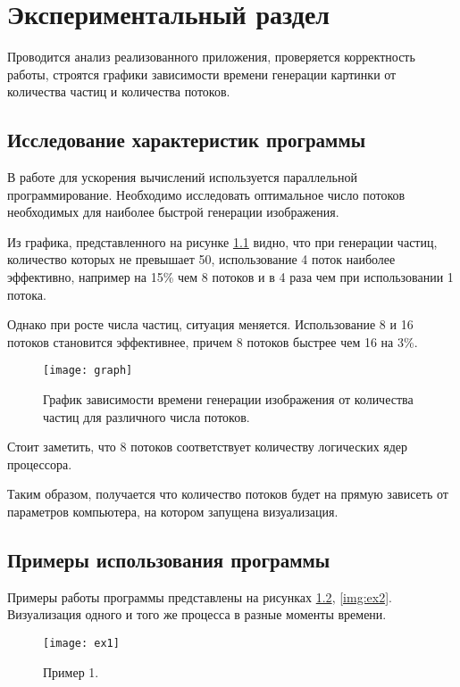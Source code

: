 \chapter{\textbf{Экспериментальный раздел}}

\hfill

Проводится анализ реализованного приложения, проверяется корректность работы, строятся графики зависимости времени генерации картинки от количества частиц и количества потоков. 

\section{\textbf{Исследование характеристик программы }}

В работе для ускорения вычислений используется параллельной программирование. Необходимо исследовать оптимальное число потоков необходимых для наиболее быстрой генерации изображения. 

Из графика, представленного на рисунке \ref{img:graph} видно, что при генерации частиц, количество которых не превышает 50, использование 4 поток наиболее эффективно, например на 15\% чем 8 потоков и в 4 раза чем при использовании 1 потока. 

Однако при росте числа частиц, ситуация меняется. Использование 8 и 16 потоков становится эффективнее, причем 8 потоков быстрее чем 16 на 3\%. 

\begin{figure}[H]
	\centering
	\texttt{[image: graph]}
	\caption{График зависимости времени генерации изображения от количества частиц для различного числа потоков. }
	\label{img:graph}
\end{figure}

Стоит заметить, что 8 потоков соответствует количеству логических ядер процессора. 

Таким образом, получается что количество потоков будет на прямую зависеть от параметров компьютера, на котором запущена визуализация. 

\section{\textbf{Примеры использования программы }}

Примеры работы программы представлены на рисунках \ref{img:ex1}, \ref{img:ex2}. Визуализация одного и того же процесса в разные моменты времени. 

\begin{figure}[H]
	\centering
	\texttt{[image: ex1]}
	\caption{Пример 1. }
	\label{img:ex1}
\end{figure}

